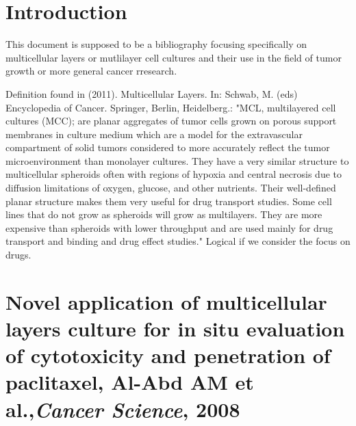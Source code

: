 \documentclass[11pt,a4paper]{article}
\begin{document}
\tableofcontents
\section*{Introduction}
This document is supposed to be a bibliography focusing specifically on multicellular layers or mutlilayer cell cultures and their use in the field of tumor growth or more general cancer rresearch. 

Definition found in (2011). Multicellular Layers. In: Schwab, M. (eds) Encyclopedia of Cancer. Springer, Berlin, Heidelberg.: "MCL, multilayered cell cultures (MCC); are planar aggregates of tumor cells grown on porous support membranes in culture medium which are a model for the extravascular compartment of solid tumors considered to more accurately reflect the tumor microenvironment than monolayer cultures. They have a very similar structure to multicellular spheroids often with regions of hypoxia and central necrosis due to diffusion limitations of oxygen, glucose, and other nutrients. Their well-defined planar structure makes them very useful for drug transport studies. Some cell lines that do not grow as spheroids will grow as multilayers. They are more expensive than spheroids with lower throughput and are used mainly for drug transport and binding and drug effect studies." Logical if we consider the focus on drugs.


\section*{Novel application of multicellular layers culture for in situ evaluation of cytotoxicity and penetration of paclitaxel, Al-Abd AM et al.,\textit{Cancer Science}, 2008}
\end{document}
